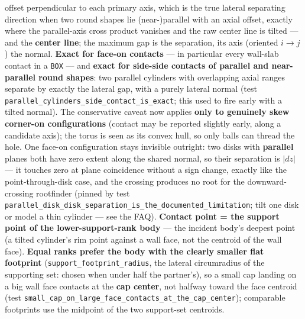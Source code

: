 \documentclass[11pt]{article}
\newcommand{\kw}[1]{\texttt{\uppercase{#1}}}
\newcommand{\code}[1]{\texttt{#1}}
\begin{document}
\begin{enumerate}
      offset perpendicular to each primary axis, which is the true lateral
      separating direction when two round shapes lie (near-)parallel with
      an axial offset, exactly where the parallel-axis cross product
      vanishes and the raw center line is tilted --- and the \textbf{center
      line}; the maximum gap is the separation, its axis (oriented
      $i \to j$) the normal. \textbf{Exact for face-on contacts} --- in
      particular every wall-slab contact in a \kw{box} --- and
      \textbf{exact for side-side contacts of parallel and near-parallel
      round shapes}: two parallel cylinders with overlapping axial ranges
      separate by exactly the lateral gap, with a purely lateral normal
      (test \code{parallel\_cylinders\_side\_contact\_is\_exact}; this used
      to fire early with a tilted normal). The conservative caveat now
      applies \textbf{only to genuinely skew corner-on configurations}
      (contact may be reported slightly early, along a candidate axis);
      the torus is seen as its convex hull, so only balls can thread the
      hole. One face-on configuration stays invisible outright: two disks
      with \textbf{parallel} planes both have zero extent along the shared
      normal, so their separation is $|dz|$ --- it touches zero at plane
      coincidence without a sign change, exactly like the
      point-through-disk case, and the crossing produces no root for the
      downward-crossing rootfinder (pinned by test
      \code{parallel\_disk\_disk\_separation\_is\_the\_documented\_limitation};
      tilt one disk or model a thin cylinder --- see the FAQ).
      \textbf{Contact point = the support point of the lower-support-rank
      body} --- the incident body's deepest point (a tilted cylinder's rim
      point against a wall face, not the centroid of the wall face).
      \textbf{Equal ranks prefer the body with the clearly smaller flat
      footprint} (\code{support\_footprint\_radius}, the lateral
      circumradius of the supporting set: chosen when under half the
      partner's), so a small cap landing on a big wall face contacts at
      the \textbf{cap center}, not halfway toward the face centroid (test
      \code{small\_cap\_on\_large\_face\_contacts\_at\_the\_cap\_center});
      comparable footprints use the midpoint of the two support-set
      centroids.
\end{enumerate}
\end{document}
